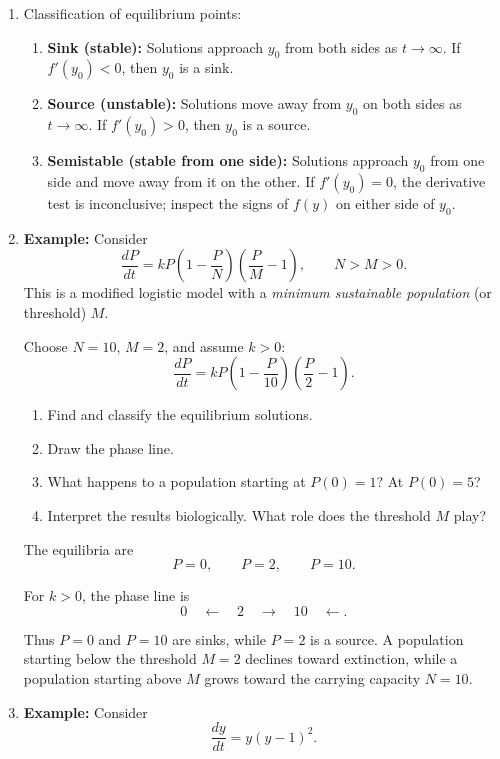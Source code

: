 \documentclass{article}
\begin{document}
\begin{enumerate}
\item Classification of equilibrium points:
\begin{enumerate}
\item \textbf{Sink (stable):} Solutions approach $y_0$ from both sides as
$t\rightarrow\infty$. If $f'(y_0)<0$, then $y_0$ is a sink.

\item \textbf{Source (unstable):} Solutions move away from $y_0$ on both sides
as $t\rightarrow\infty$. If $f'(y_0)>0$, then $y_0$ is a source.

\item \textbf{Semistable (stable from one side):} Solutions approach $y_0$ from one side and move away
from it on the other. If $f'(y_0)=0$, the derivative test is inconclusive;
inspect the signs of $f(y)$ on either side of $y_0$.
\end{enumerate}

\item \textbf{Example:} Consider
\[
\frac{dP}{dt}
=
kP\left(1-\frac{P}{N}\right)\left(\frac{P}{M}-1\right),
\qquad N>M>0.
\]
This is a modified logistic model with a \emph{minimum sustainable population}
(or threshold) $M$.

Choose $N=10$, $M=2$, and assume $k>0$:
\[
\frac{dP}{dt}
=
kP\left(1-\frac{P}{10}\right)\left(\frac{P}{2}-1\right).
\]

\begin{enumerate}
    \item Find and classify the equilibrium solutions.
    \item Draw the phase line.
    \item What happens to a population starting at $P(0)=1$? At $P(0)=5$?
    \item Interpret the results biologically. What role does the threshold $M$
    play?
\end{enumerate}

The equilibria are
\[
P=0,\qquad P=2,\qquad P=10.
\]

For $k>0$, the phase line is
\[
0\quad \longleftarrow\quad
2\quad \longrightarrow\quad
10\quad \longleftarrow.
\]

Thus $P=0$ and $P=10$ are sinks, while $P=2$ is a source. A population
starting below the threshold $M=2$ declines toward extinction, while a
population starting above $M$ grows toward the carrying capacity $N=10$.

\item \textbf{Example:} Consider
\[
\frac{dy}{dt}=y(y-1)^2.
\]


\end{enumerate}
\end{document}
